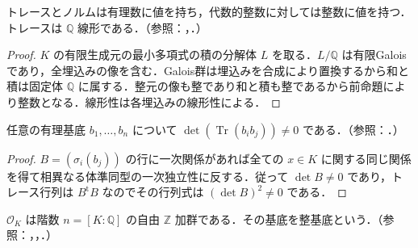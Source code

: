 \begin{prop}[トレースとノルムの整性]
トレースとノルムは有理数に値を持ち，代数的整数に対しては整数に値を持つ．トレースは $\mathbb Q$ 線形である．（参照：，．）
\end{prop}
\begin{proof}
$K$ の有限生成元の最小多項式の積の分解体 $L$ を取る．$L/\mathbb Q$ は有限Galoisであり，全埋込みの像を含む．Galois群は埋込みを合成により置換するから和と積は固定体 $\mathbb Q$ に属する．整元の像も整であり和と積も整であるから前命題により整数となる．線形性は各埋込みの線形性による．
\end{proof}
\begin{prop}[トレース形式の非退化性]
任意の有理基底 $b_1,\ldots,b_n$ について $\det(\operatorname{Tr}(b_i b_j))\ne0$ である．（参照：．）
\end{prop}
\begin{proof}
$B=(\sigma_i(b_j))$ の行に一次関係があれば全ての $x\in K$ に関する同じ関係を得て相異なる体準同型の一次独立性に反する．従って $\det B\ne0$ であり，トレース行列は $B^{\mathrm t}B$ なのでその行列式は $(\det B)^2\ne0$ である．
\end{proof}
\begin{prop}[整基底の存在]
$\mathcal O_K$ は階数 $n=[K:\mathbb Q]$ の自由 $\mathbb Z$ 加群である．その基底を整基底という．（参照：，，．）
\end{prop}
